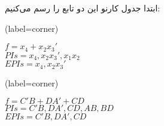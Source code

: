 ابتدا جدول کارنو این دو تابع را رسم می‌کنیم:


\begin{latin}
	\begin{minipage}{0.48\textwidth}
		\centering
		\begin{karnaugh-map}[4][4][1][$x_2$][$x_1$][$x_4$][$x_3$](label=corner)
		\end{karnaugh-map}
		$f=x_4+x_2x_3'$\\
		$PIs=x_4, x_2x_3',x_1x_2$\\
		$EPIs=x_4, x_2x_3'$\\
	\end{minipage}
	\hfill
	\begin{minipage}{0.48\textwidth}
		\centering
		\begin{karnaugh-map}[4][4][1][$B$][$A$][$D$][$C$](label=corner)
		\end{karnaugh-map}

		$f=C'B+DA'+CD$\\
		$PIs=C'B,DA',CD, AB, BD$\\
		$EPIs=C'B,DA',CD$\\
	\end{minipage}	
\end{latin}

